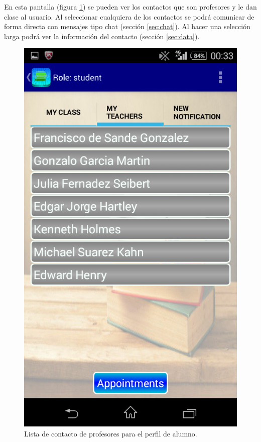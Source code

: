 			En esta pantalla (figura \ref{fig:aluProfe}) se pueden ver los contactos que son profesores y le dan clase al usuario. Al seleccionar cualquiera de los contactos se podrá comunicar de forma directa con mensajes tipo chat (sección \ref{sec:chat}). Al hacer una selección larga podrá ver la información del contacto (sección \ref{sec:data}).
		
			\begin{figure}[h !]
				\centering
				\includegraphics[scale=0.2]{Imagenes/App/aluProfe}
				\caption{Lista de contacto de profesores para el perfil de alumno.}
				\label{fig:aluProfe}
			\end{figure}
		

